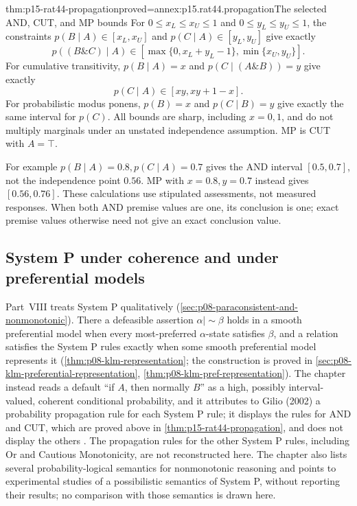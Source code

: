 \begin{hbtheorem}{thm:p15-rat44-propagation}{proved=annex:p15.rat44.propagation}{The selected AND, CUT, and MP bounds}
For \(0\leq x_L\leq x_U\leq1\) and
\(0\leq y_L\leq y_U\leq1\), the constraints
\(p(B\mid A)\in[x_L,x_U]\) and
\(p(C\mid A)\in[y_L,y_U]\) give exactly
\[
 p((B\mathbin{\&}C)\mid A)\in
 [\max\{0,x_L+y_L-1\},\min\{x_U,y_U\}].
\]
For cumulative transitivity, \(p(B\mid A)=x\) and
\(p(C\mid(A\mathbin{\&}B))=y\) give exactly
\[
                         p(C\mid A)\in[xy,xy+1-x].
\]
For probabilistic modus ponens, \(p(B)=x\) and \(p(C\mid B)=y\)
give exactly the same interval for \(p(C)\). All bounds are sharp,
including \(x=0,1\), and do not multiply marginals under an unstated
independence assumption. MP is CUT with \(A=\top\).
\end{hbtheorem}

For example \(p(B\mid A)=0.8,p(C\mid A)=0.7\) gives the AND
interval \([0.5,0.7]\), not the independence point \(0.56\).
MP with \(x=0.8,y=0.7\) instead gives \([0.56,0.76]\).
These calculations use stipulated assessments, not measured responses.
When both AND premise values are one, its conclusion is one; exact
premise values otherwise need not give an exact conclusion value.

\subsection{System P under coherence and under preferential models}
\label{sec:p15-w02b-p15-038-system-p}

Part~VIII treats System P qualitatively
(\cref{sec:p08-paraconsistent-and-nonmonotonic}). There a defeasible
assertion \(\alpha\mathrel{|\!\sim}\beta\) holds in a smooth
preferential model when every most-preferred \(\alpha\)-state satisfies
\(\beta\), and a relation satisfies the System P rules exactly when some
smooth preferential model represents it
(\cref{thm:p08-klm-representation}; the construction is proved in
\cref{sec:p08-klm-preferential-representation},
\cref{thm:p08-klm-pref-representation}). The chapter instead reads a
default ``if \(A\), then normally \(B\)'' as a high, possibly
interval-valued, coherent conditional probability, and it attributes
to Gilio (2002) a probability propagation rule for each System P rule;
it displays the rules for AND and CUT, which are proved above in
\cref{thm:p15-rat44-propagation}, and does not display the others
\cite[pp.~280--281]{Pfeifer2021ProbabilityLogic}. The propagation rules
for the other System P rules, including Or and Cautious Monotonicity,
are not reconstructed here. The chapter
also lists several probability-logical semantics for nonmonotonic
reasoning and points to experimental studies of a possibilistic semantics
of System P, without reporting their results; no comparison with those
semantics is drawn here.

